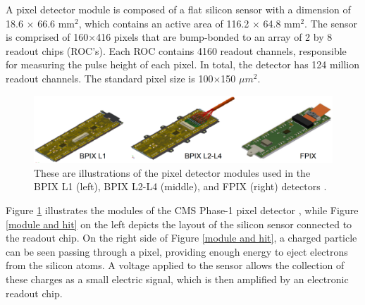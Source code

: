 A pixel detector module is composed of a flat silicon sensor with a dimension of 18.6 $\times$ 66.6 $\text{mm}^{2}$, which contains an active area of 116.2 $\times$ 64.8 $\text{mm}^{2}$. The sensor is comprised of 160$\times$416 pixels that are bump-bonded to an array of 2 by 8 readout chips (ROC's). Each ROC contains 4160 readout channels, responsible for measuring the pulse height of each pixel. In total, the detector has 124 million readout channels. The standard pixel size is 100$\times$150 $\mu m^{2}$.

\begin{center}
  \begin{figure}[h]
    \centering
    \includegraphics[scale=.2]{Chapter2/modules_drawing.png}
    \caption[Types of modules in the pixel detector]{ These are illustrations of the pixel detector modules used in the BPIX L1 (left), BPIX L2-L4 (middle), and FPIX (right) detectors \cite{phase1_Pixel_Detector}.}
    \label{modules_drawing}
  \end{figure}
\end{center}

Figure \ref{modules_drawing} illustrates the modules of the CMS Phase-1 pixel detector \cite{phase1_Pixel_Detector}, while Figure \ref{module and hit} on the left depicts the layout of the silicon sensor connected to the readout chip. On the right side of Figure \ref{module and hit}, a charged particle can be seen passing through a pixel, providing enough energy to eject electrons from the silicon atoms. A voltage applied to the sensor allows the collection of these charges as a small electric signal, which is then amplified by an electronic readout chip.

